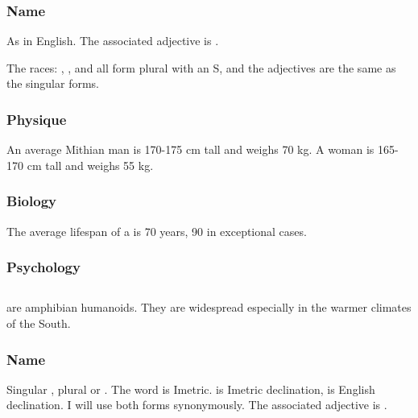 \subsubsection{Name}
As in English. The associated adjective is \emph{\human{}}. 

The races: , ,  and  all form plural with an S, and the adjectives are the same as the singular forms. 


\subsubsection{Physique}
An average Mithian \human{} man is 170-175 cm tall and weighs 70 kg. A woman is 165-170 cm tall and weighs 55 kg. 

\subsubsection{Biology}
The average lifespan of a \human{} is 70 years, 90 in exceptional cases. 

\subsubsection{Psychology}



\subsection{\Meccaran{}}
\label{Meccaran}
\label{Meccara}
\Meccara{} are amphibian humanoids. They are widespread especially in the warmer climates of the South. 

\subsubsection{Name}
Singular , plural  or \emph{\meccarans{}}. %
The word is Imetric. \emph{\Meccara{}} is Imetric declination, \emph{\meccarans{}} is English declination. I will use both forms synonymously. 
The associated adjective is \emph{\meccaran{}}. 

